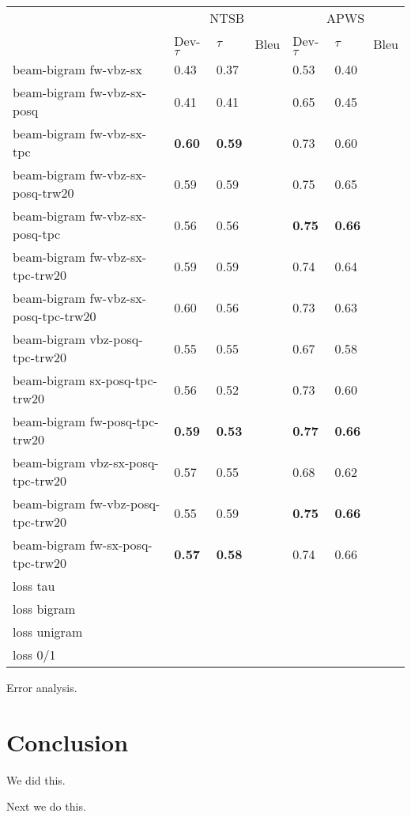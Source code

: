 \begin{table*}
  \centering
  \begin{tabular}{|l|lll|lll|}
    \hline
    & \multicolumn{3}{c|}{NTSB} &\multicolumn{3}{c|}{APWS} \\
    &Dev-$\tau$ & $\tau$ & Bleu &Dev-$\tau$ & $\tau$ & Bleu \\
    \hline
    beam-bigram fw-vbz-sx &0.43 &0.37 & & 0.53 & 0.40 & \\
    beam-bigram fw-vbz-sx-posq &0.41 &0.41 & & 0.65 & 0.45 & \\
    beam-bigram fw-vbz-sx-tpc &\textbf{0.60} &\textbf{0.59} & & 0.73 & 0.60 & \\  
    beam-bigram fw-vbz-sx-posq-trw20 &0.59 &0.59 & & 0.75 & 0.65 & \\
    beam-bigram fw-vbz-sx-posq-tpc  &0.56 &0.56 & & \textbf{0.75}  & \textbf{0.66} & \\
    beam-bigram fw-vbz-sx-tpc-trw20 &0.59 &0.59 & & 0.74 & 0.64 & \\
    beam-bigram fw-vbz-sx-posq-tpc-trw20 &0.60 &0.56 & &  0.73  & 0.63 & \\
    \hline 
    beam-bigram vbz-posq-tpc-trw20 &0.55 &0.55 & & 0.67 & 0.58 & \\ 
    beam-bigram sx-posq-tpc-trw20 &0.56 &0.52 & & 0.73 & 0.60 & \\
    beam-bigram fw-posq-tpc-trw20 &\textbf{0.59} &\textbf{0.53} & & \textbf{0.77} & \textbf{0.66} & \\
    \hline
    beam-bigram vbz-sx-posq-tpc-trw20 &0.57 &0.55 & & 0.68 &0.62 & \\
    beam-bigram fw-vbz-posq-tpc-trw20 &0.55 &0.59 & & \textbf{0.75} &\textbf{0.66}& \\
    beam-bigram fw-sx-posq-tpc-trw20  &\textbf{0.57} &\textbf{0.58} & & 0.74 &0.66 & \\
    \hline 
    \hline
    loss tau \\
    loss bigram \\
    loss unigram \\
    loss 0/1 \\
    \hline
  \end{tabular}
\end{table*}

Error analysis.

\section{Conclusion}

We did this.

Next we do this.


